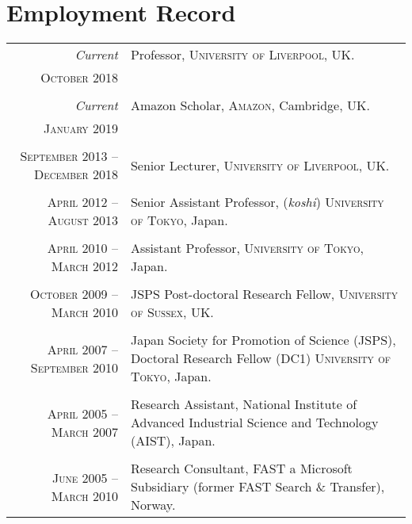 \documentclass[a4paper,11pt]{article}
\begin{document}
\section{Employment Record}
\begin{tabular}{r|p{11cm}}
 \emph{Current} & Professor, \textsc{University of Liverpool}, UK. \\\textsc{October 2018} \\\multicolumn{2}{c}{} \\
 \emph{Current} & Amazon Scholar, \textsc{Amazon}, Cambridge, UK. \\\textsc{January 2019} \\\multicolumn{2}{c}{} \\
 \textsc{September 2013 -- December 2018} & Senior Lecturer, \textsc{University of Liverpool}, UK.  \\\multicolumn{2}{c}{} \\
 \textsc{April 2012 -- August 2013} & Senior Assistant Professor, (\emph{koshi})  \textsc{University of Tokyo}, Japan. \\\multicolumn{2}{c}{} \\
\textsc{April 2010 -- March 2012} & Assistant Professor, \textsc{University of Tokyo}, Japan. \\\multicolumn{2}{c}{} \\
\textsc{October 2009 -- March 2010} & JSPS Post-doctoral Research Fellow, \textsc{University of Sussex}, UK. \\\multicolumn{2}{c}{} \\
\textsc{April 2007 -- September 2010} & Japan Society for Promotion of Science (JSPS), Doctoral Research Fellow (DC1) \textsc{University of Tokyo}, Japan. \\\multicolumn{2}{c}{} \\
\textsc{April 2005 -- March 2007} & Research Assistant, \textsf{National Institute of Advanced Industrial Science and Technology} (AIST), Japan. \\\multicolumn{2}{c}{} \\
\textsc{June 2005 -- March 2010} & Research Consultant, \textsf{FAST a Microsoft Subsidiary} (former FAST Search \& Transfer), Norway.
\end{tabular}

%
\end{document}
